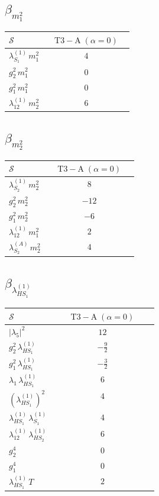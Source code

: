 \documentclass[9pt]{article}
\begin{document}
\subsection*{$ \beta_{m_1^{2}} $}
\begin{longtable}{@{}p{0.31\linewidth}c@{}}
\toprule
$\mathcal{S}$ & $ \mathrm{T3-A}\;(\alpha=0) $ \\
\midrule
$ \lambda_{S_1}^{(1)}\,m_1^{2} $ & $ 4 $ \\
$ g_2^2\,m_1^{2} $ & $ 0 $ \\
$ g_1^2\,m_1^{2} $ & $ 0 $ \\
$ \lambda_{12}^{(1)}\,m_2^{2} $ & $ 6 $ \\
\bottomrule
\end{longtable}
\subsection*{$ \beta_{m_2^{2}} $}
\begin{longtable}{@{}p{0.31\linewidth}c@{}}
\toprule
$\mathcal{S}$ & $ \mathrm{T3-A}\;(\alpha=0) $ \\
\midrule
$ \lambda_{S_2}^{(1)}\,m_2^{2} $ & $ 8 $ \\
$ g_2^2\,m_2^{2} $ & $ -12 $ \\
$ g_1^2\,m_2^{2} $ & $ -6 $ \\
$ \lambda_{12}^{(1)}\,m_1^{2} $ & $ 2 $ \\
$ \lambda_{S_2}^{(A)}\,m_2^{2} $ & $ 4 $ \\
\bottomrule
\end{longtable}
\subsection*{$ \beta_{\lambda_{HS_1}^{(1)}} $}
\begin{longtable}{@{}p{0.31\linewidth}c@{}}
\toprule
$\mathcal{S}$ & $ \mathrm{T3-A}\;(\alpha=0) $ \\
\midrule
$ |\lambda_5|^2 $ & $ 12 $ \\
$ g_2^2\,\lambda_{HS_1}^{(1)} $ & $ - \frac{9}{2} $ \\
$ g_1^2\,\lambda_{HS_1}^{(1)} $ & $ - \frac{3}{2} $ \\
$ \lambda_1\,\lambda_{HS_1}^{(1)} $ & $ 6 $ \\
$ \left(\lambda_{HS_1}^{(1)}\right)^2 $ & $ 4 $ \\
$ \lambda_{HS_1}^{(1)}\,\lambda_{S_1}^{(1)} $ & $ 4 $ \\
$ \lambda_{12}^{(1)}\,\lambda_{HS_2}^{(1)} $ & $ 6 $ \\
$ g_2^4 $ & $ 0 $ \\
$ g_1^4 $ & $ 0 $ \\
$ \lambda_{HS_1}^{(1)}\,T $ & $ 2 $ \\
\bottomrule
\end{longtable}
\end{document}
